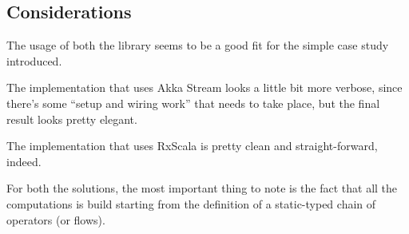 \subsection{Considerations}\label{considerations}

The usage of both the library seems to be a good fit for the simple case
study introduced.

The implementation that uses Akka Stream looks a little bit more verbose,
since there's some ``setup and wiring work'' that needs to take place,
but the final result looks pretty elegant.

The implementation that uses RxScala is pretty clean and
straight-forward, indeed.

For both the solutions, the most important thing to note is the fact
that all the computations is build starting from the definition of a
static-typed chain of operators (or flows).


